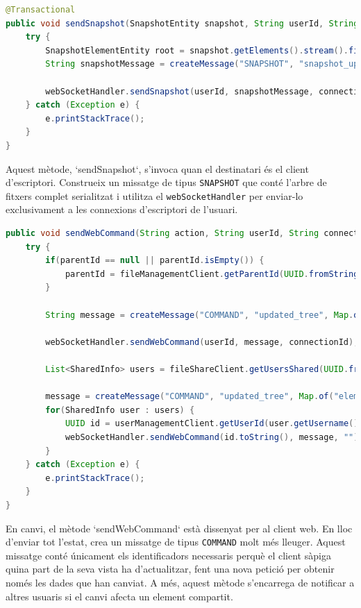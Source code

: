 \begin{lstlisting}[language=Java, caption={Enviament del snapshot complet al client d'escriptori a `WebSocketService`}]
@Transactional
public void sendSnapshot(SnapshotEntity snapshot, String userId, String connectionId) {
    try {
        SnapshotElementEntity root = snapshot.getElements().stream().filter(element -> element.getParent() == null).findFirst().orElse(null);
        String snapshotMessage = createMessage("SNAPSHOT", "snapshot_update", convertElementToMap(root));
        
        webSocketHandler.sendSnapshot(userId, snapshotMessage, connectionId);
    } catch (Exception e) {
        e.printStackTrace();
    }
}
\end{lstlisting}

Aquest mètode, `sendSnapshot`, s'invoca quan el destinatari és el client d'escriptori. Construeix un missatge de tipus \texttt{SNAPSHOT} que conté l'arbre de fitxers complet serialitzat i utilitza el \texttt{webSocketHandler} per enviar-lo exclusivament a les connexions d'escriptori de l'usuari.

\begin{lstlisting}[language=Java, caption={Enviament d'una comanda de refresc al client web a `WebSocketService`}]
public void sendWebCommand(String action, String userId, String connectionId, String elementId, String parentId) {
    try {
        if(parentId == null || parentId.isEmpty()) {
            parentId = fileManagementClient.getParentId(UUID.fromString(elementId)).toString();
        }

        String message = createMessage("COMMAND", "updated_tree", Map.of("elementId", elementId, "parentId", parentId, "section", getSection(action)));
        
        webSocketHandler.sendWebCommand(userId, message, connectionId);

        List<SharedInfo> users = fileShareClient.getUsersShared(UUID.fromString(elementId));

        message = createMessage("COMMAND", "updated_tree", Map.of("elementId", elementId, "parentId", parentId, "section", "shared"));
        for(SharedInfo user : users) {
            UUID id = userManagementClient.getUserId(user.getUsername());
            webSocketHandler.sendWebCommand(id.toString(), message, "");
        }
    } catch (Exception e) {
        e.printStackTrace();
    }
}
\end{lstlisting}

En canvi, el mètode `sendWebCommand` està dissenyat per al client web. En lloc d'enviar tot l'estat, crea un missatge de tipus \texttt{COMMAND} molt més lleuger. Aquest missatge conté únicament els identificadors necessaris perquè el client sàpiga quina part de la seva vista ha d'actualitzar, fent una nova petició per obtenir només les dades que han canviat. A més, aquest mètode s'encarrega de notificar a altres usuaris si el canvi afecta un element compartit.

